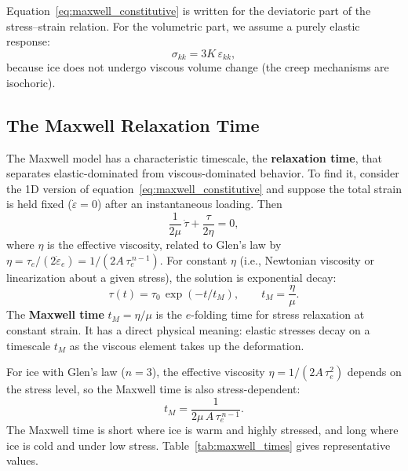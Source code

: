 \documentclass[11pt]{article}
\begin{document}
\medskip
\noindent Equation~\eqref{eq:maxwell_constitutive} is written for the deviatoric part of the stress--strain relation.  For the volumetric part, we assume a purely elastic response:
\begin{equation}
  \sigma_{kk} = 3K\,\varepsilon_{kk},
\end{equation}
because ice does not undergo viscous volume change (the creep mechanisms are isochoric).

\subsection{The Maxwell Relaxation Time}
\label{sec:maxwell_time}

The Maxwell model has a characteristic timescale, the \textbf{relaxation time}, that separates elastic-dominated from viscous-dominated behavior.  To find it, consider the 1D version of equation~\eqref{eq:maxwell_constitutive} and suppose the total strain is held fixed ($\dot{\varepsilon} = 0$) after an instantaneous loading.  Then
\begin{equation}
  \frac{1}{2\mu}\,\dot{\tau} + \frac{\tau}{2\eta} = 0,
  \label{eq:stress_relaxation_ode}
\end{equation}
where $\eta$ is the effective viscosity, related to Glen's law by $\eta = \tau_e / (2\dot{\varepsilon}_e) = 1/(2A\,\tau_e^{\,n-1})$.  For constant $\eta$ (i.e., Newtonian viscosity or linearization about a given stress), the solution is exponential decay:
\begin{equation}
  \tau(t) = \tau_0\,\exp\!\left(-t/t_M\right), \qquad t_M = \frac{\eta}{\mu}.
  \label{eq:stress_relaxation}
\end{equation}
The \textbf{Maxwell time} $t_M = \eta/\mu$ is the $e$-folding time for stress relaxation at constant strain.  It has a direct physical meaning: elastic stresses decay on a timescale $t_M$ as the viscous element takes up the deformation.

\medskip
\noindent For ice with Glen's law ($n = 3$), the effective viscosity $\eta = 1/(2A\,\tau_e^2)$ depends on the stress level, so the Maxwell time is also stress-dependent:
\begin{equation}
  \boxed{t_M = \frac{1}{2\mu\,A\,\tau_e^{\,n-1}}.}
  \label{eq:maxwell_time}
\end{equation}
The Maxwell time is short where ice is warm and highly stressed, and long where ice is cold and under low stress.  Table~\ref{tab:maxwell_times} gives representative values.
\end{document}
